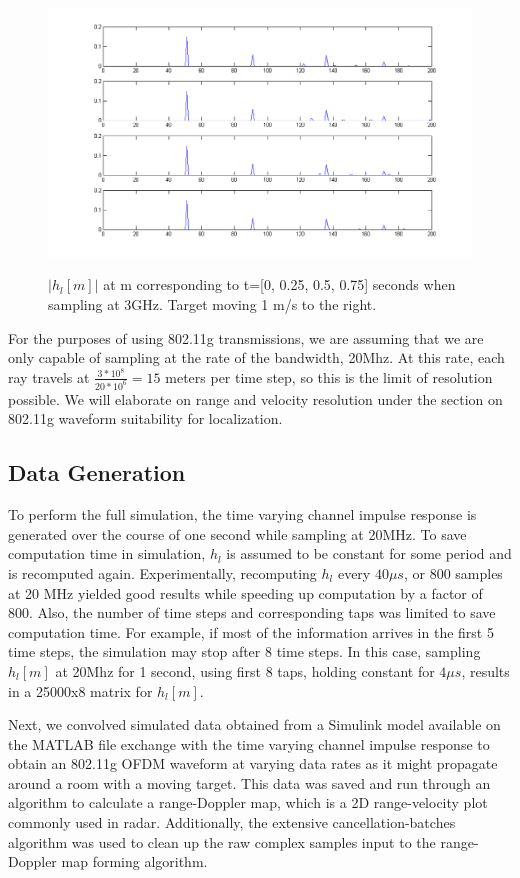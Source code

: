 \documentclass[article,11pt,onecolumn,final]{IEEEtran}
\begin{document}
\begin{figure}[H]
\caption{$|h_l[m]|$ at m corresponding to t=[0, 0.25, 0.5, 0.75] seconds when sampling at 3GHz. Target moving 1 m/s to the right. }
\centering
\includegraphics[width=400pt]{sim/impulse_response_taps.png}  
\label{fig:Impulse Response}
\end{figure}

For the purposes of using 802.11g transmissions, we are assuming that we are only capable of sampling at the rate of the bandwidth, 20Mhz. At this rate, each ray travels at $\frac{3*10^8}{20*10^6} = 15$ meters per time step, so this is the limit of resolution possible. We will elaborate on range and velocity resolution under the section on 802.11g waveform suitability for localization.

\subsection{Data Generation}
To perform the full simulation, the time varying channel impulse response is generated over the course of one second while sampling at 20MHz. To save computation time in simulation, $h_l$ is assumed to be constant for some period and is recomputed again. Experimentally, recomputing $h_l$ every $40 \mu s$, or 800 samples at 20 MHz yielded good results while speeding up computation by a factor of 800. Also, the number of time steps and corresponding taps was limited to save computation time. For example, if most of the information arrives in the first 5 time steps, the simulation may stop after 8 time steps. In this case, sampling $h_l[m]$ at 20Mhz for 1 second, using first 8 taps, holding constant for $4 \mu s$, results in a 25000x8 matrix for $h_l[m]$.

Next, we convolved simulated data obtained from a Simulink model available on the MATLAB file exchange \cite{Saxena} with the time varying channel impulse response to obtain an 802.11g OFDM waveform at varying data rates as it might propagate around a room with a moving target. This data was saved and run through an algorithm to calculate a range-Doppler map, which is a 2D range-velocity plot commonly used in radar. Additionally, the extensive cancellation-batches algorithm was used to clean up the raw complex samples input to the range-Doppler map forming algorithm.
\end{document}
